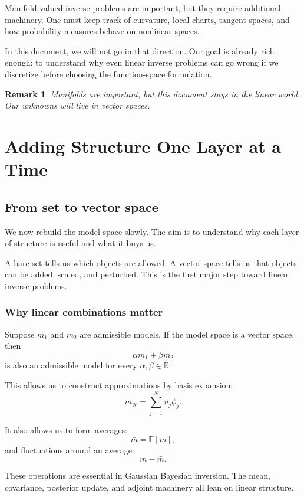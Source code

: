 \documentclass[11pt,a4paper]{book}
\newtheorem{remark}[definition]{Remark}
\newcommand{\R}{\mathbb{R}}
\begin{document}
Manifold-valued inverse problems are important, but they require additional
machinery. One must keep track of curvature, local charts, tangent spaces, and
how probability measures behave on nonlinear spaces.

In this document, we will not go in that direction. Our goal is already rich
enough: to understand why even linear inverse problems can go wrong if we
discretize before choosing the function-space formulation.

\begin{remark}
Manifolds are important, but this document stays in the linear world.
Our unknowns will live in vector spaces.
\end{remark}


\chapter{Adding Structure One Layer at a Time}

\section{From set to vector space}

We now rebuild the model space slowly. The aim is to understand why each layer
of structure is useful and what it buys us.

A bare set tells us which objects are allowed. A vector space tells us that
objects can be added, scaled, and perturbed. This is the first major step toward
linear inverse problems.

\subsection{Why linear combinations matter}

Suppose $m_1$ and $m_2$ are admissible models. If the model space is a vector
space, then
\[
    \alpha m_1+\beta m_2
\]
is also an admissible model for every $\alpha,\beta\in\R$.

This allows us to construct approximations by basis expansion:
\[
    m_N
    =
    \sum_{j=1}^N u_j\phi_j.
\]

It also allows us to form averages:
\[
    \bar{m}
    =
    \mathbb{E}[m],
\]
and fluctuations around an average:
\[
    m-\bar{m}.
\]

These operations are essential in Gaussian Bayesian inversion. The mean,
covariance, posterior update, and adjoint machinery all lean on linear
structure.
\end{document}
